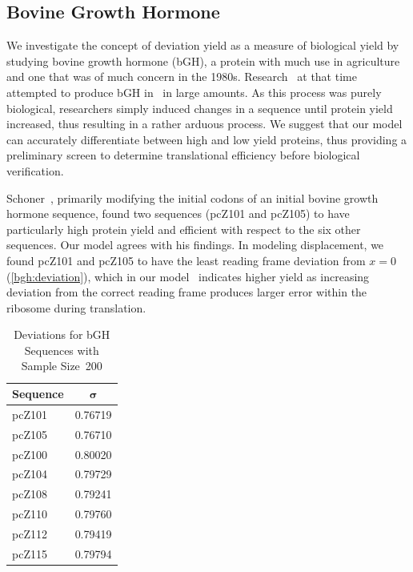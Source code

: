 \documentclass[12pt, draft]{article}
\numberwithin{equation}{section}
\begin{document}
\subsection{Bovine Growth Hormone}


We investigate the concept of deviation yield as a measure of biological
yield by studying bovine growth hormone (bGH), a protein with much use in agriculture
and one that was of much concern in the 1980s.
Research~\cite{schoner:bgh} at that time attempted to produce bGH
in \ecoli\ in large amounts.  As this process was purely biological, researchers
simply induced changes in a sequence until protein yield increased, thus resulting
in a rather arduous process.  We suggest that our model can accurately
differentiate between high and low yield proteins, thus providing a preliminary screen
to determine translational efficiency before biological verification.

Schoner~\cite{schoner:bgh}, primarily modifying the initial codons of an initial
bovine growth hormone sequence, found two sequences (pcZ101 and pcZ105)
to have particularly high protein yield and efficient with respect to
the six other sequences. Our model agrees with his findings. In modeling displacement,
we found pcZ101 and pcZ105 to have the least reading frame deviation
from $x = 0$ (\autoref{bgh:deviation}), which in our model~\cite{lalit:mechanics} indicates
higher yield as increasing deviation from the correct reading frame
produces larger error within the ribosome during translation.

\begin{table}[tbp]
\begin{center}
    \begin{tabular}{lc}
        \toprule
        \textbf{Sequence} & $\mathbf{\sigma}$\\
        \midrule
        pcZ101 & 0.76719\\
        pcZ105 & 0.76710\\
        \midrule
        pcZ100 & 0.80020\\
        pcZ104 & 0.79729\\
        pcZ108 & 0.79241\\
        pcZ110 & 0.79760\\
        pcZ112 & 0.79419\\
        pcZ115 & 0.79794\\
        \bottomrule
    \end{tabular}
    \caption{Deviations for bGH Sequences with Sample Size~200}
    \label{bgh:deviation}
\end{center}
\end{table}
\end{document}

